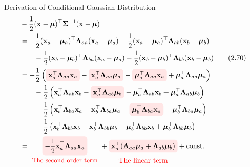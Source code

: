 \documentclass[10pt]{beamer}
\newcommand{\highlight}[2][yellow]{\tikz[baseline=(x.base)]{\node[rectangle,rounded corners,fill=#1!10](x){$#2$};}}
\newcommand{\highlightcap}[3][yellow]{\tikz[baseline=(x.base)]{\node[rectangle,rounded corners,fill=#1!10](x){$#2$} node[below of=x, node distance=2em, color=#1]{#3};}}
\begin{document}
    \begin{frame}{Derivation of Conditional Gaussian Distribution}
        \begin{align*}
            &-\frac{1}{2}(\mathbf x - \bm\mu)^\top \bm\Sigma^{-1}(\mathbf x - \bm\mu) \\
            &=-\frac{1}{2}(\mathbf x_a - \bm\mu_a)^\top \bm\Lambda_{aa}(\mathbf x_a - \bm\mu_a)
            -\frac{1}{2}(\mathbf x_a - \bm\mu_a)^\top \bm\Lambda_{ab}(\mathbf x_b - \bm\mu_b) \\
            &\qquad -\frac{1}{2}(\mathbf x_b - \bm\mu_b)^\top \bm\Lambda_{ba}(\mathbf x_a - \bm\mu_a)
            -\frac{1}{2}(\mathbf x_b - \bm\mu_b)^\top \bm\Lambda_{bb}(\mathbf x_b - \bm\mu_b) \tag{2.70} \\
            &= -\frac{1}{2}\left( \highlight[red]{\mathbf x_a^\top\bm\Lambda_{aa}\mathbf x_a} - \highlight[red]{\mathbf x_a^\top\bm\Lambda_{aa}\bm\mu_a} - 
                               \highlight[red]{\bm\mu_a^\top\bm\Lambda_{aa}\mathbf x_a} + \bm\mu_a^\top\bm\Lambda_{aa}\bm\mu_a \right) \\
            &\qquad -\frac{1}{2}\left( \mathbf x_a^\top\bm\Lambda_{ab}\mathbf x_b - \highlight[red]{\mathbf x_a^\top\bm\Lambda_{ab}\bm\mu_b} - 
                               \bm\mu_a^\top\bm\Lambda_{ab}\mathbf x_b + \bm\mu_a^\top\bm\Lambda_{ab}\bm\mu_b \right) \\
            &\qquad -\frac{1}{2}\left( \mathbf x_b^\top\bm\Lambda_{ba}\mathbf x_a - \mathbf x_b^\top\bm\Lambda_{ba}\bm\mu_a - 
                               \highlight[red]{\bm\mu_b^\top\bm\Lambda_{ba}\mathbf x_a} + \bm\mu_b^\top\bm\Lambda_{ba}\bm\mu_a \right) \\
            &\qquad -\frac{1}{2}\left( \mathbf x_b^\top\bm\Lambda_{bb}\mathbf x_b - \mathbf x_b^\top\bm\Lambda_{bb}\bm\mu_b - 
                               \bm\mu_b^\top\bm\Lambda_{bb}\mathbf x_b + \bm\mu_b^\top\bm\Lambda_{bb}\bm\mu_b \right) \\
            &= \highlightcap[red]{\displaystyle -\frac{1}{2}\mathbf x_a^\top\bm\Lambda_{aa}\mathbf x_a}{\small The second order term}
                + \highlightcap[red]{\mathbf x_a^\top(\bm\Lambda_{aa}\bm\mu_a + \bm\Lambda_{ab}\bm\mu_b)}{The linear term}
                + \mathrm{const.}
        \end{align*}
    \end{frame}
\end{document}
